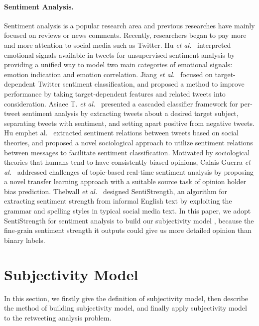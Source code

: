 \documentclass[twocolumn]{svjour3}          %
\begin{document}
\paragraph{Sentiment Analysis.}
Sentiment analysis is a popular research area and previous researches have mainly focused on reviews or news comments. 
Recently, researchers began to pay more and more attention to social media such as Twitter.  
Hu \emph{et al.}~\cite{Hu:2013www} interpreted emotional signals available in tweets for unsupervised sentiment analysis by providing a unified way to model two main categories of emotional signals: emotion indication and emotion correlation. 
Jiang \emph{et al.}~\cite{Jiang:2011TTS} focused on target-dependent Twitter sentiment classification, and proposed a method to improve performance by taking target-dependent features and related tweets into consideration. 
Asiaee T. \emph{et al.}~\cite{AsiaeeT:2012} presented a cascaded classifier framework for per-tweet sentiment analysis by extracting tweets about a desired target subject, separating tweets with sentiment, and setting apart positive from negative tweets.
Hu emph{et al.}~\cite{Hu:2013ESR} extracted sentiment relations between tweets based on social theories, and proposed a novel sociological approach to utilize sentiment relations between messages to facilitate sentiment classification.
Motivated by sociological theories that humans tend to have consistently biased opinions, Calais Guerra \emph{et al.}~\cite{CalaisGuerra:2011BOT} addressed challenges of topic-based real-time sentiment analysis by proposing a novel transfer learning approach with a suitable source task of opinion holder bias prediction. 
Thelwall \emph{et al.}~\cite{Thelwall:2010SSS,Thelwall:2012SSD} designed SentiStrength, an algorithm for extracting sentiment strength from informal English text by exploiting the grammar and spelling styles in typical social media text. 
In this paper, we adopt SentiStrength for sentiment analysis to build our subjectivity model , because the fine-grain sentiment strength it outputs could give us more detailed opinion than binary labels.

\section{Subjectivity Model }
\label{subject}

In this section, we firstly give the definition of subjectivity model, then describe the method of building subjectivity model, and finally apply subjectivity model to the retweeting analysis problem. 
\end{document}
